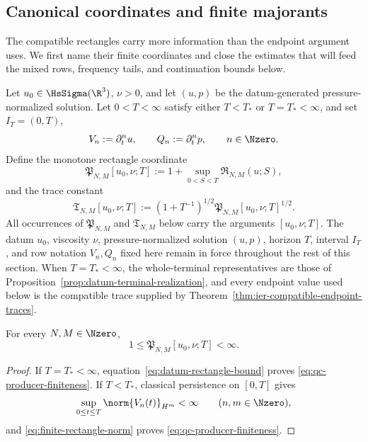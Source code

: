 \subsection{Canonical coordinates and finite majorants}

The compatible rectangles carry more information than the endpoint argument
uses.  We first name their finite coordinates and close the estimates that will
feed the mixed rows, frequency tails, and continuation bounds below.

\begin{definition}
\label{def:qc-producer-constants}
Let \(u_0\in\HsSigma(\R^3)\), \(\nu>0\), and let \((u,p)\) be the
datum-generated pressure-normalized solution.  Let \(0<T<\infty\) satisfy
either \(T<T_*\) or \(T=T_*<\infty\), and set
\(I_T=(0,T)\),
\[
 V_n:=\partial_t^n u,
 \qquad
 Q_n:=\partial_t^n p,
 \qquad n\in\Nzero.
\]
Define the monotone rectangle coordinate
\begin{equation}
 \mathfrak P_{N,M}[u_0,\nu;T]
 :=1+\sup_{0<S<T}\mathfrak R_{N,M}(u;S),
 \label{eq:qc-producer-constant}
\end{equation}
and the trace constant
\begin{equation}
 \mathfrak T_{N,M}[u_0,\nu;T]
 :=\left(1+T^{-1}\right)^{1/2}
   \mathfrak P_{N,M}[u_0,\nu;T]^{1/2}.
 \label{eq:qc-trace-constant}
\end{equation}
All occurrences of \(\mathfrak P_{N,M}\) and \(\mathfrak T_{N,M}\) below
carry the arguments \([u_0,\nu;T]\).
The datum \(u_0\), viscosity \(\nu\), pressure-normalized solution
\((u,p)\), horizon \(T\), interval \(I_T\), and row notation \(V_n,Q_n\)
fixed here remain in force throughout the rest of this section.
When \(T=T_*<\infty\), the whole-terminal representatives are those of
Proposition~\ref{prop:datum-terminal-realization}, and every endpoint value
used below is the compatible trace supplied by
Theorem~\ref{thm:ier-compatible-endpoint-traces}.
\end{definition}

\begin{lemma}
\label{lem:qc-producer-finiteness}
For every \(N,M\in\Nzero\),
\begin{equation}
 1\le \mathfrak P_{N,M}[u_0,\nu;T]<\infty.
 \label{eq:qc-producer-finiteness}
\end{equation}
\end{lemma}

\begin{proof}
If \(T=T_*<\infty\), equation~\eqref{eq:datum-rectangle-bound} proves
\eqref{eq:qc-producer-finiteness}.  If \(T<T_*\), classical persistence on
\([0,T]\) gives
\[
 \sup_{0\le t\le T}\norm{V_n(t)}_{H^m}<\infty
 \qquad(n,m\in\Nzero),
\]
and \eqref{eq:finite-rectangle-norm} proves
\eqref{eq:qc-producer-finiteness}.
\end{proof}

